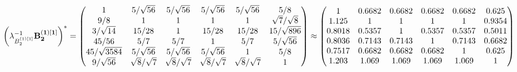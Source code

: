 \documentclass[10pt,a4paper]{article}
\begin{document}
	\[
		\left(\lambda_{B_2^{(1)[1]}}^{-1}\bold{B_2^{(1)[1]}}\right)^* = 
		\begin{pmatrix}
			{1}{} & {{5}} / {\sqrt{56}} & {{5}} / {\sqrt{56}} & {{5}} / {\sqrt{56}} & {{5}} / {\sqrt{56}} & {{5}} / {{8}} \\
			{{9}} / {{8}} & {1}{} & {1}{} & {1}{} & {1}{} & {\sqrt{7}} / {\sqrt{8}} \\
			{{3}} / {\sqrt{14}} & {{15}} / {{28}} & {1}{} & {{15}} / {{28}} & {{15}} / {{28}} & {{15}} / {\sqrt{896}} \\
			{{45}} / {{56}} & {{5}} / {{7}} & {{5}} / {{7}} & {1}{} & {{5}} / {{7}} & {{5}} / {\sqrt{56}} \\
			{{45}} / {\sqrt{3584}} & {{5}} / {\sqrt{56}} & {{5}} / {\sqrt{56}} & {{5}} / {\sqrt{56}} & {1}{} & {{5}} / {{8}} \\
			{{9}} / {\sqrt{56}} & {\sqrt{8}} / {\sqrt{7}} & {\sqrt{8}} / {\sqrt{7}} & {\sqrt{8}} / {\sqrt{7}} & {\sqrt{8}} / {\sqrt{7}} & {1}{} \\
		\end{pmatrix}
		\approx
		\begin{pmatrix}
			1        & 0.6682   & 0.6682   & 0.6682   & 0.6682   & 0.625    \\
			1.125    & 1        & 1        & 1        & 1        & 0.9354   \\
			0.8018   & 0.5357   & 1        & 0.5357   & 0.5357   & 0.5011   \\
			0.8036   & 0.7143   & 0.7143   & 1        & 0.7143   & 0.6682   \\
			0.7517   & 0.6682   & 0.6682   & 0.6682   & 1        & 0.625    \\
			1.203    & 1.069    & 1.069    & 1.069    & 1.069    & 1        \\
		\end{pmatrix}
	\]
\end{document}
